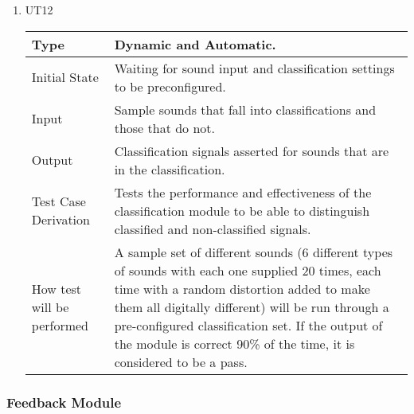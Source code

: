 \documentclass[12pt, titlepage]{article}
\begin{document}
\begin{enumerate}

\item{UT12\\}

\begin{tabular}{ |p{5cm}||p{7cm}| }
    \hline
    Type & Dynamic and Automatic. \\
    \hline
    Initial State  &  Waiting for sound input and classification settings to be preconfigured. \\
    \hline
    Input &   Sample sounds that fall into classifications and those that do not. \\
    \hline
    Output &   Classification signals asserted for sounds that are in the classification.  \\
    \hline
    Test Case Derivation &   Tests the performance and effectiveness of the classification module to be able to distinguish classified and non-classified signals. \\
    \hline
    How test will be performed & A sample set of different sounds (6 different types of sounds with each one supplied 20 times, each time with a random distortion added to make them all digitally different) will be run through a pre-configured classification set. If the output of the module is correct 90\% of the time, it is considered to be a pass. \\
    \hline
\end{tabular}

\end{enumerate}


\subsubsection{Feedback Module}
\end{document}
